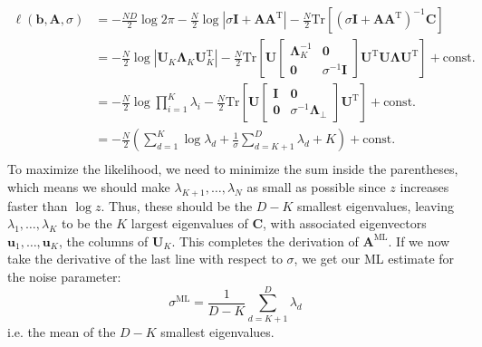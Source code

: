 \documentclass[a4paper]{article}
\begin{document}
\begin{align*}
\ell(\mathbf{b,A},\sigma) &= -\frac{ND}{2}\log 2\pi - \frac{N}{2}\log |\sigma \mathbf{I} + \mathbf{AA}^\textrm{T}| - \frac{N}{2} \textrm{Tr}\left[ (\sigma \mathbf{I} + \mathbf{AA}^\textrm{T})^{-1} \mathbf{C} \right] \\
&= - \frac{N}{2}\log |\mathbf{U}_K \mathbf{\Lambda}_K \mathbf{U}_K^\textrm{T}| - \frac{N}{2} \textrm{Tr}\left[ \mathbf{U} \begin{bmatrix} \mathbf{\Lambda}_K^{-1} & \mathbf{0} \\ \mathbf{0} & \sigma^{-1} \mathbf{I} \end{bmatrix} \mathbf{U}^\textrm{T} \mathbf{U} \mathbf{\Lambda} \mathbf{U}^\textrm{T}\right] + \text{const.} \\
&= - \frac{N}{2}\log \prod_{i=1}^K \lambda_i - \frac{N}{2} \textrm{Tr}\left[ \mathbf{U} \begin{bmatrix} \mathbf{I} & \mathbf{0} \\ \mathbf{0} & \sigma^{-1} \mathbf{\Lambda}_\perp \end{bmatrix} \mathbf{U}^\textrm{T}\right] + \text{const.} \\
&= -\frac{N}{2}\left( \sum_{d=1}^K \log \lambda_d + \frac{1}{\sigma}\sum_{d=K+1}^D \lambda_d + K \right) + \text{const.} \\
\end{align*}
To maximize the likelihood, we need to minimize the sum inside the parentheses, which means we should make $\lambda_{K+1},\ldots,\lambda_N$ as small as possible since $z$ increases faster than $\log z$. Thus, these should be the $D-K$ smallest eigenvalues, leaving $\lambda_1,\ldots,\lambda_K$ to be the $K$ largest eigenvalues of $\mathbf{C}$, with associated eigenvectors $\mathbf{u}_1,\ldots,\mathbf{u}_K$, the columns of $\mathbf{U}_K$. This completes the derivation of $\mathbf{A}^\textrm{ML}$. If we now take the derivative of the last line with respect to $\sigma$, we get our ML estimate for the noise parameter:
\[\sigma^\textrm{ML} = \frac{1}{D-K}\sum_{d=K+1}^D \lambda_d\]
i.e. the mean of the $D-K$ smallest eigenvalues. 
\end{document}
